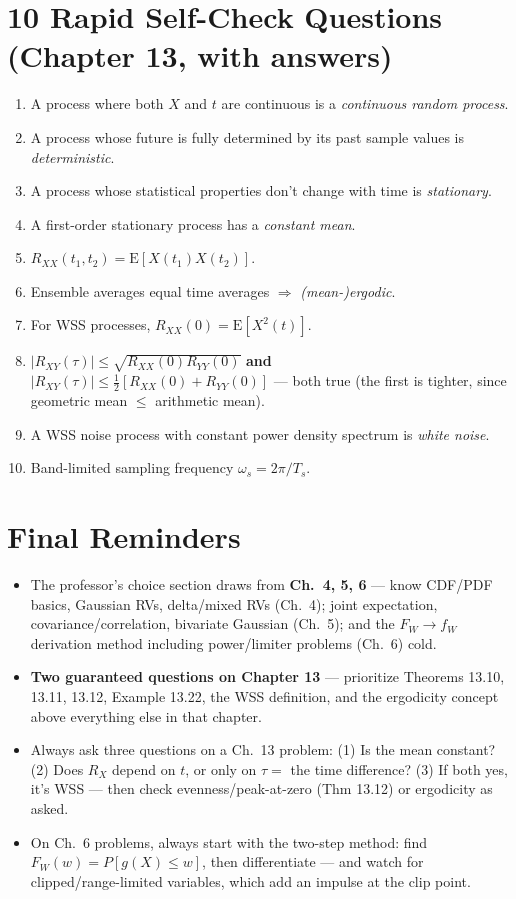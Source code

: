 \documentclass[11pt]{article}
\newcommand{\E}[1]{\mathrm{E}\left[#1\right]}
\renewcommand{\P}[1]{P\left[#1\right]}
\begin{document}
\section*{10 Rapid Self-Check Questions (Chapter 13, with answers)}
\begin{enumerate}
\item[1.] A process where both $X$ and $t$ are continuous is a \emph{continuous random
process}.
\item[2.] A process whose future is fully determined by its past sample values is
\emph{deterministic}.
\item[3.] A process whose statistical properties don't change with time is
\emph{stationary}.
\item[4.] A first-order stationary process has a \emph{constant mean}.
\item[5.] $R_{XX}(t_1,t_2)=\E{X(t_1)X(t_2)}$.
\item[6.] Ensemble averages equal time averages $\Rightarrow$ \emph{(mean-)ergodic}.
\item[7.] For WSS processes, $R_{XX}(0)=\E{X^2(t)}$.
\item[8.] $|R_{XY}(\tau)|\le\sqrt{R_{XX}(0)R_{YY}(0)}$ \textbf{and}
$|R_{XY}(\tau)|\le\tfrac12[R_{XX}(0)+R_{YY}(0)]$ --- both true (the first is tighter, since
geometric mean $\le$ arithmetic mean).
\item[9.] A WSS noise process with constant power density spectrum is \emph{white noise}.
\item[10.] Band-limited sampling frequency $\omega_s = 2\pi/T_s$.
\end{enumerate}

\clearpage
\section*{Final Reminders}
\begin{itemize}
\item The professor's choice section draws from \textbf{Ch.\ 4, 5, 6} --- know CDF/PDF basics,
Gaussian RVs, delta/mixed RVs (Ch.\ 4); joint expectation, covariance/correlation, bivariate
Gaussian (Ch.\ 5); and the $F_W\to f_W$ derivation method including power/limiter problems
(Ch.\ 6) cold.
\item \textbf{Two guaranteed questions on Chapter 13} --- prioritize Theorems 13.10, 13.11,
13.12, Example 13.22, the WSS definition, and the ergodicity concept above everything else in
that chapter.
\item Always ask three questions on a Ch.\ 13 problem: (1) Is the mean constant? (2) Does
$R_X$ depend on $t$, or only on $\tau=$ the time difference? (3) If both yes, it's WSS ---
then check evenness/peak-at-zero (Thm 13.12) or ergodicity as asked.
\item On Ch.\ 6 problems, always start with the two-step method: find $F_W(w)=\P{g(X)\le w}$,
then differentiate --- and watch for clipped/range-limited variables, which add an impulse at
the clip point.
\end{itemize}
\end{document}
